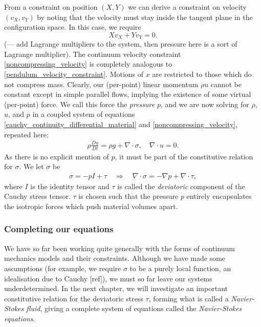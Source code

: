 \documentclass[11pt,a4paper]{memoir}
\begin{document}
From a constraint on position $(X,Y)$ we can derive a constraint on velocity $(v_X,v_Y)$ by noting that the velocity must stay inside
the tangent plane in the configuration space. In this case, we require
\begin{equation}\label{pendulum_velocity_constraint}
    Xv_X + Yv_Y = 0.
\end{equation}
(--- add Lagrange multipliers to the system, then pressure here is a sort of Lagrange multiplier).
The continuum velocity constraint \eqref{noncompressing_velocity} is completely analogous to \eqref{pendulum_velocity_constraint}.
Motions of $x$ are restricted to those which do not compress mass. Clearly, our (per-point) linear momentum $\rho u$
cannot be constant except in simple parallel flows, implying the existence of some virtual (per-point) force.
We call this force the \textit{pressure} $p$, and we are now solving for $\rho$, $u$, and $p$ in a coupled system of equations
\eqref{cauchy_continuity_differential_material} and \eqref{noncompressing_velocity}, repeated here:
\begin{align*}
    \rho\frac{Du}{Dt} = \rho g + \nabla\cdot\sigma,\quad
        \nabla \cdot u = 0.
\end{align*}
As there is no explicit mention of $p$, it must be part of the constitutive relation for $\sigma$.
We let $\sigma$ be
\begin{align*}
    \sigma = -pI + \tau \quad\Rightarrow\quad \nabla\cdot\sigma = -\nabla p + \nabla\cdot \tau,
\end{align*}
where $I$ is the identity tensor and $\tau$ is called the \textit{deviatoric} component of the Cauchy stress tensor.
$\tau$ is chosen such that the pressure $p$ entirely encapsulates the isotropic forces which push material volumes apart.

\subsubsection{Completing our equations}
We have so far been working quite generally with the forms of continuum mechanics models and their constraints. Although we have made some assumptions
(for example, we require $\sigma$ to be a purely local function, an idealisation due to Cauchy [ref]), we must so far leave
our systems underdetermined.
In the next chapter, we will
investigate an important constitutive relation for the deviatoric stress $\tau$, forming what is called a \textit{Navier-Stokes fluid},
giving a complete system of equations called the \textit{Navier-Stokes equations}.
\end{document}
